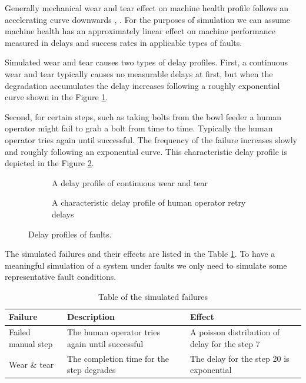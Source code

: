 \documentclass[procedia]{easychair}
\begin{document}
Generally mechanical wear and tear effect on machine health profile follows
an accelerating curve downwards \cite{eker2012major}, \cite{milldataset}. For the purposes of simulation we can assume machine health has an approximately
linear effect on machine performance measured in delays and success rates in applicable types of faults.

Simulated wear and tear causes two types of delay profiles.
First, a continuous wear and tear typically causes no measurable delays at first, but when the degradation accumulates the delay increases following
a roughly exponential curve shown in the Figure \ref{figure:continuouswearandtear}.

Second, for certain steps, such as taking bolts from the bowl feeder a human operator
might fail to grab a bolt from time to time. Typically the human operator tries again until successful. The frequency of the failure increases
slowly and roughly following an exponential curve. This characteristic delay profile is depicted in the Figure \ref{figure:retrydelays}.

\begin{figure}[tb]
\tiny
\begin{subfigure}[h]{0.47\linewidth}
 \resizebox{\linewidth}{!}{}
 \caption{A delay profile of continuous wear and tear\newline}
 \label{figure:continuouswearandtear}
\end{subfigure}
\begin{subfigure}[h]{0.47\linewidth}
 \resizebox{\linewidth}{!}{}
 \caption{A characteristic delay profile of human operator retry delays}
 \label{figure:retrydelays}
\end{subfigure}
 \caption{Delay profiles of faults.}
 \label{figure:delayprofiles}
\end{figure}

The simulated failures and their effects are listed in the Table \ref{failures}. To have a meaningful simulation of a system under faults we only need to simulate some representative fault conditions.

\begin{table}[tb]
\tiny
\renewcommand{\arraystretch}{1.3}
\caption{Table of the simulated failures}
\label{failures}
\centering
\begin{tabular}{|p{40mm}|p{40mm}|p{50mm}|}
\hline
Failure & Description & Effect \\
\hline
\hline
Failed manual step & The human operator tries again until successful & A poisson distribution of delay for the step 7 \\
\hline
Wear \& tear & The completion time for the step degrades & The delay for the step 20 is exponential \\
\hline
\end{tabular}
\end{table}
\end{document}

